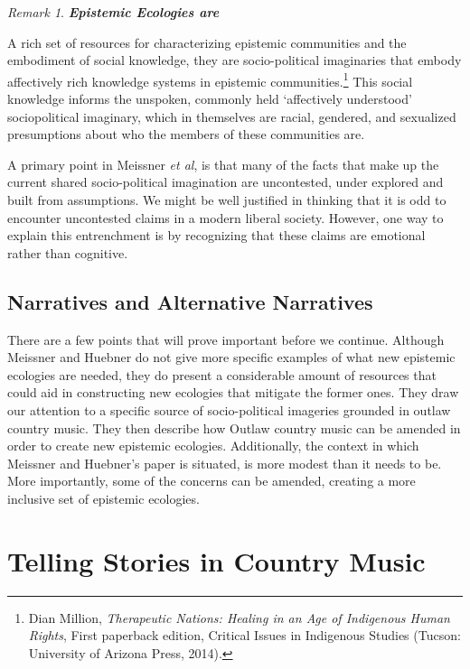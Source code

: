 \documentclass[phdthesis,12pt,final]{wuthesis}
\theoremstyle{definition}
\theoremstyle{definition}
\theoremstyle{definition}
\theoremstyle{definition}
\theoremstyle{remark}
\newtheorem*{remark}{Remark}
\begin{document}
\begin{remark}
\textbf{\emph{Epistemic Ecologies are}}

A rich set of resources for characterizing epistemic communities and the embodiment of social knowledge, they are socio-political imaginaries that embody affectively rich knowledge systems in epistemic communities.\footnote{Dian Million, \emph{Therapeutic {Nations}: {Healing} in an {Age} of {Indigenous Human Rights}}, First paperback edition, Critical {Issues} in {Indigenous Studies} (Tucson: University of Arizona Press, 2014).} This social knowledge informs the unspoken, commonly held `affectively understood' sociopolitical imaginary, which in themselves are racial, gendered, and sexualized presumptions about who the members of these communities are.
\end{remark}

A primary point in Meissner \emph{et al}, is that many of the facts that make up the current shared socio-political imagination are uncontested, under explored and built from assumptions. We might be well justified in thinking that it is odd to encounter uncontested claims in a modern liberal society. However, one way to explain this entrenchment is by recognizing that these claims are emotional rather than cognitive.

\subsection*{Narratives and Alternative Narratives}\label{narratives-and-alternative-narratives}

There are a few points that will prove important before we continue. Although Meissner and Huebner do not give more specific examples of what new epistemic ecologies are needed, they do present a considerable amount of resources that could aid in constructing new ecologies that mitigate the former ones. They draw our attention to a specific source of socio-political imageries grounded in outlaw country music. They then describe how Outlaw country music can be amended in order to create new epistemic ecologies. Additionally, the context in which Meissner and Huebner's paper is situated, is more modest than it needs to be. More importantly, some of the concerns can be amended, creating a more inclusive set of epistemic ecologies.

\section{Telling Stories in Country Music}\label{telling-stories-in-country-music}
\end{document}
